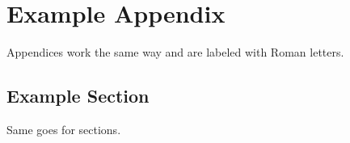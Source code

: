 \chapter{Example Appendix}
Appendices work the same way and are labeled with Roman letters.
\section{Example Section}
Same goes for sections.